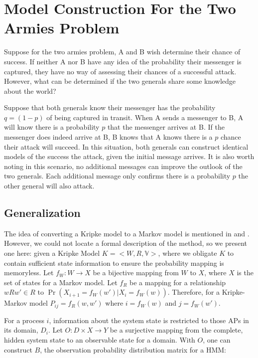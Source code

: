 \section{Model Construction For the Two Armies Problem}
Suppose for the two armies problem, A and B wish determine their chance of success.
If neither A nor B have any idea of the probability their messenger is captured, they have no way of assessing their chances of a successful attack.
However, what can be determined if the two generals share some knowledge about the world?

Suppose that both generals know their messenger has the probability $q=(1-p)$ of being captured in transit.
When A sends a messenger to B, A will know there is a probability $p$ that the messenger arrives at B.
If the messenger does indeed arrive at B, B knows that A knows there is a $p$ chance their attack will succeed.
In this situation, both generals can construct identical models of the success the attack, given the initial message arrives.
It is also worth noting in this scenario, no additional messages can improve the outlook of the two generals.
Each additional message only confirms there is a probability $p$ the other general will also attack.

\subsection{Generalization}

The idea of converting a Kripke model to a Markov model is mentioned in \cite{kripkemarkov1} and \cite{kripkemarkov2}.
However, we could not locate a formal description of the method, so we present one here:
given a Kripke Model $K = <W,R,\mathbb{V}>$, where we obligate $K$ to contain sufficient state information to ensure the probability mapping is memoryless.
Let $f_{W} : W \rightarrow X$ be a bijective mapping from $W$ to $X$, where $X$ is the set of states for a Markov model.
Let $f_{R}$ be a mapping for a relationship $wRw' \in R$ to $\Pr(X_{i+1}=f_W(w') | X_{i}=f_W(w))$.
Therefore, for a Kripke-Markov model $P_{ij} = f_R(w,w')$ where $i=f_W(w)$ and $j=f_W(w')$.

For a process $i$, information about the system state is restricted to those \ac{AP}s in its domain, $D_i$.
Let $O : D \times X \rightarrow Y$ be a surjective mapping from the complete, hidden system state to an observable state for a domain.
With $O$, one can construct $B$, the observation probability distribution matrix for a \ac{HMM}:

